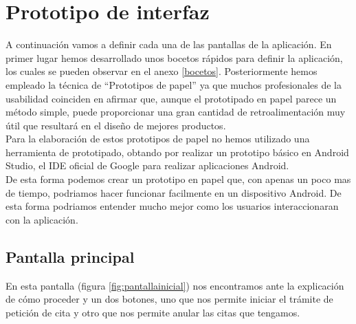 \documentclass[a4paper,11pt]{article}
\begin{document}
\section{Prototipo de interfaz}
A continuación vamos a definir cada una de las pantallas de la aplicación. En primer lugar hemos desarrollado unos bocetos rápidos para definir la aplicación, los cuales se pueden observar en el anexo \ref{bocetos}. Posteriormente hemos empleado la técnica de “Prototipos de papel” ya que muchos profesionales de la usabilidad coinciden en afirmar que, aunque el prototipado en papel parece un método simple, puede proporcionar una gran cantidad de retroalimentación muy útil que resultará en el diseño de mejores productos\cite{carolyn2003retroalimentacion}.\\
Para la elaboración de estos prototipos de papel no hemos utilizado una herramienta de prototipado, obtando por realizar un prototipo básico en Android Studio\cite{androidstudio}, el IDE oficial de Google para realizar aplicaciones Android.\\
De esta forma podemos crear un prototipo en papel que, con apenas un poco mas de tiempo, podriamos hacer funcionar facilmente en un dispositivo Android. De esta forma podriamos entender mucho mejor como los usuarios interaccionaran con la aplicación.\\


\subsection{Pantalla principal}
En esta pantalla (figura \ref{fig:pantallainicial}) nos encontramos ante la explicación de cómo proceder y un dos botones, uno que nos permite iniciar el trámite de petición de cita y otro que nos permite anular las citas que tengamos.
\end{document}
